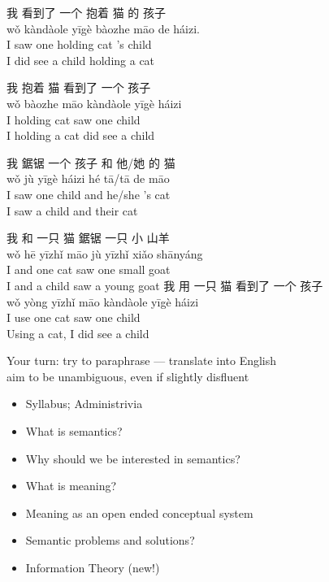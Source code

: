\documentclass[headrule,footrule]{foils}
\begin{document}
\makexeCJKactive
\begin{exe}
  \ex \glll 我 看到了 一个 抱着 猫 的 孩子 \\
  wǒ   kàndàole    yīgè   bàozhe  māo  de    háizi. \\
  I saw one holding cat 's child \\
  \trans I did see a child holding a cat

  \ex \glll 我 抱着 猫 看到了 一个 孩子 \\
  wǒ  bàozhe māo kàndàole  yīgè     háizi \\
  I holding cat saw one  child \\
 \trans I holding a cat did see a child

  \ex \glll 我 鋸锯  一个 孩子 和 他/她 的 猫 \\
wǒ jù  yīgè    háizi  hé  tā/tā   de māo \\
 I      saw    one    child   and     he/she  's cat\\
 \trans I saw  a child and their cat 

  \ex \glll 我 和 一只 猫 鋸锯 一只 小 山羊 \\
wǒ hē  yīzhǐ  māo jù yīzhǐ xiǎo  shānyáng  \\
I and one cat saw one small goat \\

\trans I and a child saw a young goat
  \ex \glll 我 用 一只 猫 看到了 一个 孩子 \\
wǒ yòng yīzhǐ  māo kàndàole  yīgè  háizi \\
I use one cat saw one child \\
\trans Using a cat, I did see a child
\end{exe}
\makexeCJKinactive

\bigskip
\begin{center} \large
  Your turn: try to paraphrase --- translate into English
  \\ aim to be unambiguous, even if slightly disfluent\task
\end{center}

\begin{itemize}
\item Syllabus; Administrivia
\item What is semantics?
\item Why should we be interested in semantics?
\item What is meaning?
\item Meaning as an open ended conceptual system
\item Semantic problems and solutions?
\item Information Theory (new!)
\end{itemize}
\end{document}
